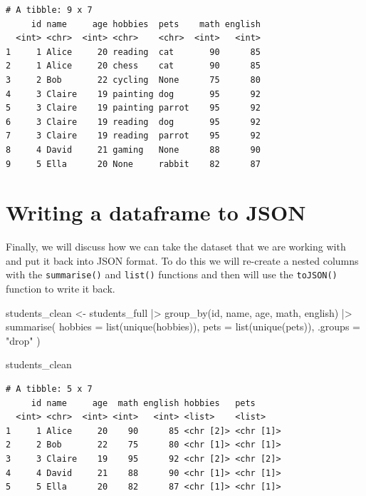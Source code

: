 \documentclass[
  letterpaper,
  DIV=11,
  numbers=noendperiod]{scrreprt}
\newenvironment{Shaded}{\begin{snugshade}}{\end{snugshade}}
\newcommand{\AttributeTok}[1]{\textcolor[rgb]{0.40,0.45,0.13}{#1}}
\newcommand{\FunctionTok}[1]{\textcolor[rgb]{0.28,0.35,0.67}{#1}}
\newcommand{\NormalTok}[1]{\textcolor[rgb]{0.00,0.23,0.31}{#1}}
\newcommand{\OtherTok}[1]{\textcolor[rgb]{0.00,0.23,0.31}{#1}}
\newcommand{\SpecialCharTok}[1]{\textcolor[rgb]{0.37,0.37,0.37}{#1}}
\newcommand{\StringTok}[1]{\textcolor[rgb]{0.13,0.47,0.30}{#1}}
\begin{document}
\begin{verbatim}
# A tibble: 9 x 7
     id name     age hobbies  pets    math english
  <int> <chr>  <int> <chr>    <chr>  <int>   <int>
1     1 Alice     20 reading  cat       90      85
2     1 Alice     20 chess    cat       90      85
3     2 Bob       22 cycling  None      75      80
4     3 Claire    19 painting dog       95      92
5     3 Claire    19 painting parrot    95      92
6     3 Claire    19 reading  dog       95      92
7     3 Claire    19 reading  parrot    95      92
8     4 David     21 gaming   None      88      90
9     5 Ella      20 None     rabbit    82      87
\end{verbatim}

\section{Writing a dataframe to JSON}\label{writing-a-dataframe-to-json}

Finally, we will discuss how we can take the dataset that we are working
with and put it back into JSON format. To do this we will re-create a
nested columns with the \texttt{summarise()} and \texttt{list()}
functions and then will use the \texttt{toJSON()} function to write it
back.

\begin{Shaded}
\begin{Highlighting}[]
\NormalTok{students\_clean }\OtherTok{\textless{}{-}}\NormalTok{ students\_full }\SpecialCharTok{|\textgreater{}}
  \FunctionTok{group\_by}\NormalTok{(id, name, age, math, english) }\SpecialCharTok{|\textgreater{}}
  \FunctionTok{summarise}\NormalTok{(}
    \AttributeTok{hobbies =} \FunctionTok{list}\NormalTok{(}\FunctionTok{unique}\NormalTok{(hobbies)),}
    \AttributeTok{pets =} \FunctionTok{list}\NormalTok{(}\FunctionTok{unique}\NormalTok{(pets)),}
    \AttributeTok{.groups =} \StringTok{"drop"}
\NormalTok{  )}

\NormalTok{students\_clean}
\end{Highlighting}
\end{Shaded}

\begin{verbatim}
# A tibble: 5 x 7
     id name     age  math english hobbies   pets     
  <int> <chr>  <int> <int>   <int> <list>    <list>   
1     1 Alice     20    90      85 <chr [2]> <chr [1]>
2     2 Bob       22    75      80 <chr [1]> <chr [1]>
3     3 Claire    19    95      92 <chr [2]> <chr [2]>
4     4 David     21    88      90 <chr [1]> <chr [1]>
5     5 Ella      20    82      87 <chr [1]> <chr [1]>
\end{verbatim}
\end{document}
